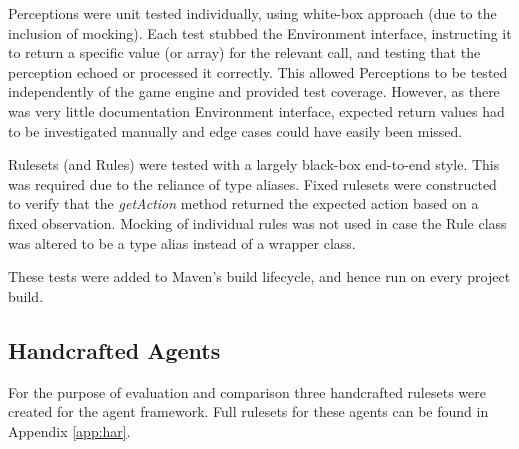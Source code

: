 Perceptions were unit tested individually, using white-box approach (due to the inclusion of mocking). Each test stubbed the Environment interface, instructing it to return a specific value (or array) for the relevant call, and testing that the perception echoed or processed it correctly. This allowed Perceptions to be tested independently of the game engine and provided test coverage. However, as there was very little documentation Environment interface, expected return values had to be investigated manually and edge cases could have easily been missed.

Rulesets (and Rules) were tested with a largely black-box end-to-end style. This was required due to the reliance of type aliases. Fixed rulesets were constructed to verify that the \emph{getAction} method returned the expected action based on a fixed observation. Mocking of individual rules was not used in case the Rule class was altered to be a type alias instead of a wrapper class.

These tests were added to Maven's build lifecycle, and hence run on every project build.


\subsection{Handcrafted Agents}
\label{subsec:hca}

For the purpose of evaluation and comparison three handcrafted rulesets were created for the agent framework. Full rulesets for these agents can be found in Appendix \ref{app:har}.


